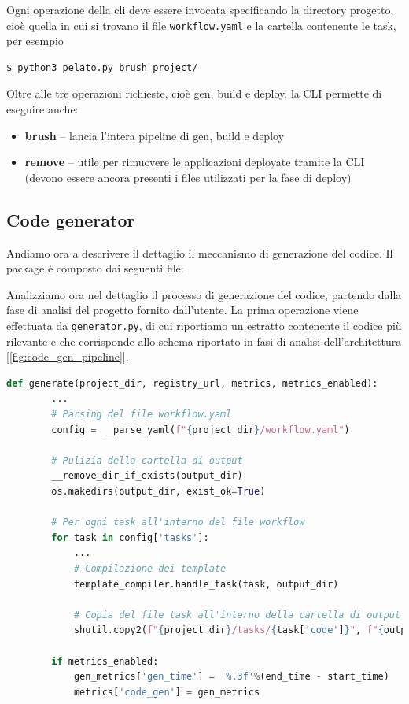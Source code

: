 Ogni operazione della cli deve essere invocata specificando la directory progetto, cioè quella in cui si trovano il file \texttt{workflow.yaml} e la cartella contenente le task, per esempio

\begin{lstlisting}[language=bash, caption={Invocazione Pelato CLI}, captionpos=b, label={code:pelato_cli_brush}]
    $ python3 pelato.py brush project/
\end{lstlisting}

Oltre alle tre operazioni richieste, cioè gen, build e deploy, la CLI permette di eseguire anche:
\begin{itemize}
    \item \textbf{brush} -- lancia l'intera pipeline di gen, build e deploy
    \item \textbf{remove} -- utile per rimuovere le applicazioni deployate tramite la CLI (devono essere ancora presenti i files utilizzati per la fase di deploy)
\end{itemize}

\subsection{Code generator}

Andiamo ora a descrivere il dettaglio il meccanismo di generazione del codice. Il package è composto dai seguenti file:


Analizziamo ora nel dettaglio il processo di generazione del codice, partendo dalla fase di analisi del progetto fornito dall'utente. La prima operazione viene effettuata da \texttt{generator.py}, di cui riportiamo un estratto contenente il codice più rilevante e che corrisponde allo schema riportato in fasi di analisi dell'architettura [\ref{fig:code_gen_pipeline}].
\begin{lstlisting}[language=python, caption={Generazione del codice}, captionpos=b, label={code:code_gen}]
    def generate(project_dir, registry_url, metrics, metrics_enabled):
        ...
        # Parsing del file workflow.yaml
        config = __parse_yaml(f"{project_dir}/workflow.yaml")
        
        # Pulizia della cartella di output
        __remove_dir_if_exists(output_dir)
        os.makedirs(output_dir, exist_ok=True)
        
        # Per ogni task all'interno del file workflow
        for task in config['tasks']:
            ...
            # Compilazione dei template
            template_compiler.handle_task(task, output_dir)

            # Copia del file task all'interno della cartella di output
            shutil.copy2(f"{project_dir}/tasks/{task['code']}", f"{output_dir}/{task['component_name']}/{task['code']}")
                
        if metrics_enabled:
            gen_metrics['gen_time'] = '%.3f'%(end_time - start_time)
            metrics['code_gen'] = gen_metrics
\end{lstlisting}

